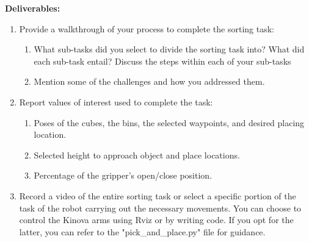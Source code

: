 \documentclass[12pt]{article}
\begin{document}
\textbf{Deliverables:}

\begin{enumerate}
    \item Provide a walkthrough of your process to complete the sorting task:
    \begin{enumerate}
        \item What sub-tasks did you select to divide the sorting task into? What did each sub-task entail?	Discuss the steps within each of your sub-tasks
        
        \item Mention some of the challenges and how you addressed them.
    \end{enumerate}
    \item Report values of interest used to complete the task:
    \begin{enumerate}
        \item Poses of the cubes, the bins, the selected waypoints, and desired placing location.
        \item Selected height to approach object and place locations.
        \item Percentage of the gripper’s open/close position.
        
    \end{enumerate}
    
    \item Record a video of the entire sorting task or select a specific portion of the task of the robot carrying out the necessary movements. You can choose to control the Kinova arms using Rviz or by writing code. If you opt for the latter, you can refer to the "pick\_and\_place.py" file for guidance.
\end{enumerate}
\end{document}
